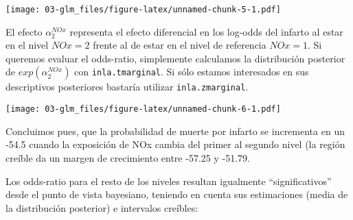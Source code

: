 \documentclass[
]{book}
\newenvironment{Shaded}{\begin{snugshade}}{\end{snugshade}}
\newcommand{\AttributeTok}[1]{\textcolor[rgb]{0.77,0.63,0.00}{#1}}
\newcommand{\DecValTok}[1]{\textcolor[rgb]{0.00,0.00,0.81}{#1}}
\newcommand{\FloatTok}[1]{\textcolor[rgb]{0.00,0.00,0.81}{#1}}
\newcommand{\FunctionTok}[1]{\textcolor[rgb]{0.00,0.00,0.00}{#1}}
\newcommand{\NormalTok}[1]{#1}
\newcommand{\OtherTok}[1]{\textcolor[rgb]{0.56,0.35,0.01}{#1}}
\newcommand{\SpecialCharTok}[1]{\textcolor[rgb]{0.00,0.00,0.00}{#1}}
\newcommand{\StringTok}[1]{\textcolor[rgb]{0.31,0.60,0.02}{#1}}
\begin{document}
\texttt{[image: 03-glm\_files/figure-latex/unnamed-chunk-5-1.pdf]}

El efecto \(\alpha_2^{NOx}\) representa el efecto diferencial en los log-odds del infarto al estar en el nivel \(NOx=2\) frente al de estar
en el nivel de referencia \(NOx=1\). Si queremos evaluar el odds-ratio, simplemente
calculamos la distribución posterior de \(exp(\alpha_2^{NOx})\) con
\texttt{inla.tmarginal}. Si sólo estamos interesados en sus descriptivos posteriores bastaría utilizar \texttt{inla.zmarginal}.

\begin{Shaded}
\end{Shaded}

\texttt{[image: 03-glm\_files/figure-latex/unnamed-chunk-6-1.pdf]}

Concluimos pues, que la probabilidad de muerte por infarto se incrementa en un -54.5 cuando
la exposición de NOx cambia del primer al segundo nivel (la región creíble da un margen de crecimiento entre -57.25 y -51.79.

Los odds-ratio para el resto de los niveles resultan igualmente ``significativos'' desde el punto de vista bayesiano, teniendo en cuenta sus estimaciones (media de la distribución posterior) e intervalos creíbles:
\end{document}
